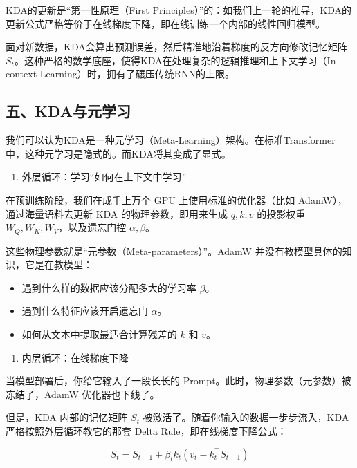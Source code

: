 KDA的更新是``第一性原理（First Principles）''的：如我们上一轮的推导，KDA的更新公式严格等价于在线梯度下降，即在线训练一个内部的线性回归模型。

面对新数据，KDA会算出预测误差，然后精准地沿着梯度的反方向修改记忆矩阵 \(S_t\)。这种严格的数学底座，使得KDA在处理复杂的逻辑推理和上下文学习（In-context Learning）时，拥有了碾压传统RNN的上限。

\hypertarget{ux4e94kdaux4e0eux5143ux5b66ux4e60}{%
\subsection{五、KDA与元学习}\label{ux4e94kdaux4e0eux5143ux5b66ux4e60}}

我们可以认为KDA是一种元学习（Meta-Learning）架构。在标准Transformer中，这种元学习是隐式的。而KDA将其变成了显式。

\begin{enumerate}
\def\labelenumi{\arabic{enumi}.}
\tightlist
\item
  外层循环：学习``如何在上下文中学习''
\end{enumerate}

在预训练阶段，我们在成千上万个 GPU 上使用标准的优化器（比如 AdamW），通过海量语料去更新 KDA 的物理参数，即用来生成 \(q,k,v\) 的投影权重 \(W_Q,W_K,W_V\)，以及遗忘门控 \(\alpha,\beta\)。

这些物理参数就是``元参数（Meta-parameters）''。AdamW 并没有教模型具体的知识，它是在教模型：

\begin{itemize}
\tightlist
\item
  遇到什么样的数据应该分配多大的学习率 \(\beta\)。
\item
  遇到什么特征应该开启遗忘门 \(\alpha\)。
\item
  如何从文本中提取最适合计算残差的 \(k\) 和 \(v\)。
\end{itemize}

\begin{enumerate}
\def\labelenumi{\arabic{enumi}.}
\setcounter{enumi}{1}
\tightlist
\item
  内层循环：在线梯度下降
\end{enumerate}

当模型部署后，你给它输入了一段长长的 Prompt。此时，物理参数（元参数）被冻结了，AdamW 优化器也下线了。

但是，KDA 内部的记忆矩阵 \(S_t\) 被激活了。随着你输入的数据一步步流入，KDA 严格按照外层循环教它的那套 Delta Rule，即在线梯度下降公式：

\[
S_t=S_{t-1}+\beta_tk_t\left(v_t-k_t^\top S_{t-1}\right)
\]

